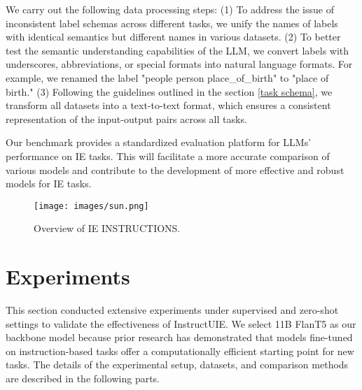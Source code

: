 We carry out the following data processing steps: (1) To address the issue of inconsistent label schemas across different tasks, we unify the names of labels with identical semantics but different names in various datasets. (2) To better test the semantic understanding capabilities of the LLM, we convert labels with underscores, abbreviations, or special formats into natural language formats. For example, we renamed the label "people person place\_of\_birth" to "place of birth." (3) Following the guidelines outlined in the section \ref{task schema}, we transform all datasets into a text-to-text format, which ensures a consistent representation of the input-output pairs across all tasks.

Our benchmark provides a standardized evaluation platform for LLMs' performance on IE tasks. This will facilitate a more accurate comparison of various models and contribute to the development of more effective and robust models for IE tasks.

\begin{figure}[t]
\small
\centering
  \texttt{[image: images/sun.png]}
  \caption{Overview of IE INSTRUCTIONS.}
 \label{benchmark_sun}
\end{figure}

\section{Experiments}
This section conducted extensive experiments under supervised and zero-shot settings to validate the effectiveness of InstructUIE. 
We select 11B FlanT5 \cite{chung2022scaling} as our backbone model because prior research \cite{Longpre2023TheFC} has demonstrated that models fine-tuned on instruction-based tasks offer a computationally efficient starting point for new tasks.
The details of the experimental setup, datasets, and comparison methods are described in the following parts.

